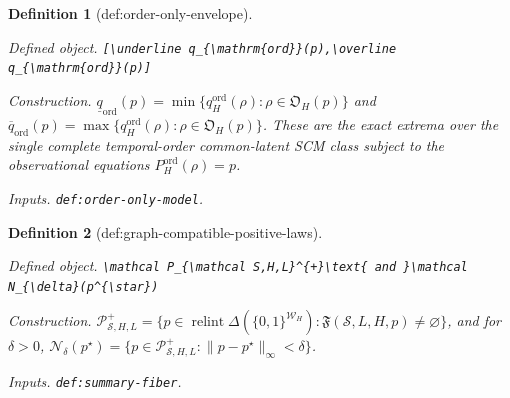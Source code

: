 \documentclass{article}
\newtheorem{definition}{Definition}
\begin{document}
\begin{definition}[def:order-only-envelope]\label{def:order-only-envelope}
\par\smallskip\noindent\emph{Defined object.} \texttt{[\textbackslash{}\allowbreak{}underline q\_\allowbreak{}\{\textbackslash{}\allowbreak{}mathrm\{ord\}\allowbreak{}\}\allowbreak{}(p),\allowbreak{}\textbackslash{}\allowbreak{}overline q\_\allowbreak{}\{\textbackslash{}\allowbreak{}mathrm\{ord\}\allowbreak{}\}\allowbreak{}(p)]}
\par\smallskip\noindent\emph{Construction.} \(\underline q_{\mathrm{ord}}(p)=\min\{q_H^{\mathrm{ord}}(\rho):\rho\in\mathfrak O_H(p)\}\) and \(\overline q_{\mathrm{ord}}(p)=\max\{q_H^{\mathrm{ord}}(\rho):\rho\in\mathfrak O_H(p)\}\). These are the exact extrema over the single complete temporal-order common-latent SCM class subject to the observational equations \(P_H^{\mathrm{ord}}(\rho)=p\).
\par\smallskip\noindent\emph{Inputs.} \texttt{def:\allowbreak{}order-\allowbreak{}only-\allowbreak{}model}.
\end{definition}

\begin{definition}[def:graph-compatible-positive-laws]\label{def:graph-compatible-positive-laws}
\par\smallskip\noindent\emph{Defined object.} \texttt{\textbackslash{}\allowbreak{}mathcal P\_\allowbreak{}\{\textbackslash{}\allowbreak{}mathcal S,\allowbreak{}H,\allowbreak{}L\}\allowbreak{}\textasciicircum{}\{+\allowbreak{}\}\allowbreak{}\textbackslash{}\allowbreak{}text\{ and \}\allowbreak{}\textbackslash{}\allowbreak{}mathcal N\_\allowbreak{}\{\textbackslash{}\allowbreak{}delta\}\allowbreak{}(p\textasciicircum{}\{\textbackslash{}\allowbreak{}star\}\allowbreak{})}
\par\smallskip\noindent\emph{Construction.} \(\mathcal P_{\mathcal S,H,L}^{+}=\{p\in\operatorname{relint}\Delta(\{0,1\}^{\mathcal W_H}):\mathfrak F(\mathcal S,L,H,p)\ne\varnothing\}\), and for \(\delta>0\), \(\mathcal N_{\delta}(p^{\star})=\{p\in\mathcal P_{\mathcal S,H,L}^{+}:\|p-p^{\star}\|_{\infty}<\delta\}\).
\par\smallskip\noindent\emph{Inputs.} \texttt{def:\allowbreak{}summary-\allowbreak{}fiber}.
\end{definition}
\end{document}
